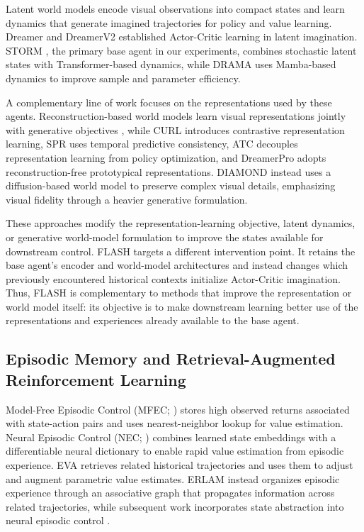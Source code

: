 \documentclass{article} %
\begin{document}
Latent world models encode visual observations into compact states and learn dynamics that generate imagined trajectories for policy and value learning. Dreamer \citep{hafner2019dream} and DreamerV2 \citep{hafner2020mastering} established Actor-Critic learning in latent imagination. STORM \citep{zhang2023storm}, the primary base agent in our experiments, combines stochastic latent states with Transformer-based dynamics, while DRAMA \citep{wang2025drama} uses Mamba-based dynamics to improve sample and parameter efficiency.

A complementary line of work focuses on the representations used by these agents. Reconstruction-based world models learn visual representations jointly with generative objectives \citep{hafner2019learning}, while CURL \citep{laskin2020curl} introduces contrastive representation learning, SPR \citep{schwarzer2020data} uses temporal predictive consistency, ATC \citep{stooke2021decoupling} decouples representation learning from policy optimization, and DreamerPro \citep{deng2022dreamerpro} adopts reconstruction-free prototypical representations. DIAMOND \citep{alonso2024diffusion} instead uses a diffusion-based world model to preserve complex visual details, emphasizing visual fidelity through a heavier generative formulation.

These approaches modify the representation-learning objective, latent dynamics, or generative world-model formulation to improve the states available for downstream control. FLASH targets a different intervention point. It retains the base agent's encoder and world-model architectures and instead changes which previously encountered historical contexts initialize Actor-Critic imagination. Thus, FLASH is complementary to methods that improve the representation or world model itself: its objective is to make downstream learning better use of the representations and experiences already available to the base agent.

\subsection{Episodic Memory and Retrieval-Augmented Reinforcement Learning}

Model-Free Episodic Control (MFEC; \citealp{blundell2016model}) stores high observed returns associated with state-action pairs and uses nearest-neighbor lookup for value estimation. Neural Episodic Control (NEC; \citealp{pritzel2017neural}) combines learned state embeddings with a differentiable neural dictionary to enable rapid value estimation from episodic experience. EVA \citep{hansen2018fast} retrieves related historical trajectories and uses them to adjust and augment parametric value estimates. ERLAM \citep{zhu2020episodic} instead organizes episodic experience through an associative graph that propagates information across related trajectories, while subsequent work incorporates state abstraction into neural episodic control \citep{li2023neural}.
\end{document}
